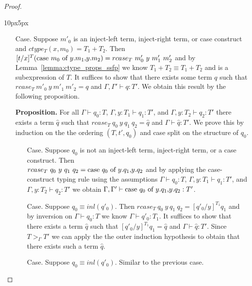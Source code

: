 \begin{proof}
\begin{changemargin}{10px}{5px}
\begin{itemize}
\begin{itemize}
  \item[Case.] Suppose $m'_0$ is an inject-left term, inject-right term, or case construct and $ctype_T(x,m_0) = T_1+T_2$.  Then\\
    $[t/x]^{T} (\mbox{case}\ m_0\ \text{of}\ y\text{.}m_1\text{,}y\text{.}m_2) = rcase_{T}\ m'_0\ y\ m'_1\
    m'_2$ and by \\ Lemma~\ref{lemma:ctype_props_ssfp} we know
    $T_1 + T_2 \equiv T_1+T_2$ and is a subexpression of $T$.
    It suffices to show that there exists some term
    $q$ such that \\ $rcase_{T}\ m'_0\ y\ m'_1\ m'_2 = q$ and $\Gamma, \Gamma' \vdash q:T'$.  We obtain this
    result by the following proposition.
       
    {\bf Proposition.} For all $\Gamma \vdash q_0:T$, $\Gamma, y:T_1 \vdash q_1:T'$, 
    and $\Gamma, y:T_2 \vdash q_2:T'$ there exists a term $\hat{q}$ such that 
    $rcase_{T}\ q_0\ y\ q_1\ q_2 = \hat{q}$ and $\Gamma \vdash \hat{q}:T'$.  
    We prove this by induction on the the ordering $(T, t', q_0)$ and case split on the structure of $q_0$.
    \begin{itemize}
    \item[Case.] Suppose $q_0$ is not an inject-left term, inject-right term, or a case construct.  Then\\
      $rcase_{T}\ q_0\ y\ q_1\ q_2 = \mbox{case}\ q_0\ \text{of}\ y\text{.}q_1\text{,}y\text{.}q_2$ and by applying the case-construct typing rule
      using the assumptions $\Gamma \vdash q_0:T$, $\Gamma, y:T_1 \vdash q_1:T'$, 
      and $\Gamma, y:T_2 \vdash q_2:T'$ we obtain $\Gamma,\Gamma' \vdash \mbox{case}\ q_0\ \text{of}\ y\text{.}q_1\text{,}y\text{.}q_2:T'$.
      
    \item[Case.] Suppose $q_0 \equiv inl(q'_0)$.  Then $rcase_{T}\ q_0\ y\ q_1\ q_2 = [q'_0/y]^{T_1} q_1$ and
      by inversion on $\Gamma \vdash q_0:T$ we know $\Gamma \vdash q'_0:T_1$.  It suffices to show that there
      exists a term $\hat{q}$ such that $[q'_0/y]^{T_1} q_1 = \hat{q}$  and $\Gamma \vdash \hat{q}:T'$.  
      Since $T >_{\Gamma} T'$ we can apply the the outer induction hypothesis to obtain that there exists 
      such a term $\hat{q}$.
      
    \item[Case.] Suppose $q_0 \equiv inl(q'_0)$.  Similar to the previous case.
      

\end{itemize}
\end{itemize}
\end{itemize}
\end{changemargin}
\end{proof}
